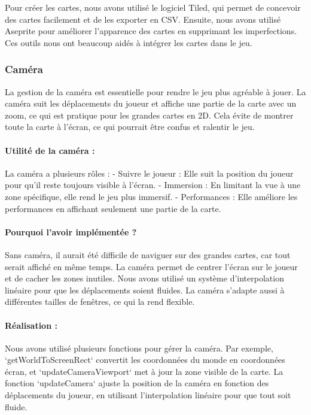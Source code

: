 \documentclass[12pt,a4paper, twoside]{article}
\begin{document}
    Pour créer les cartes, nous avons utilisé le logiciel Tiled, qui permet de concevoir des cartes facilement et de les exporter en CSV. Ensuite, nous avons utilisé Aseprite pour améliorer l'apparence des cartes en supprimant les imperfections. Ces outils nous ont beaucoup aidés à intégrer les cartes dans le jeu.
    \subsubsection{Caméra}
    La gestion de la caméra est essentielle pour rendre le jeu plus agréable à jouer. La caméra suit les déplacements du joueur et affiche une partie de la carte avec un zoom, ce qui est pratique pour les grandes cartes en 2D. Cela évite de montrer toute la carte à l'écran, ce qui pourrait être confus et ralentir le jeu.

    \paragraph{Utilité de la caméra :} La caméra a plusieurs rôles :
    - Suivre le joueur : Elle suit la position du joueur pour qu'il reste toujours visible à l'écran.
    - Immersion : En limitant la vue à une zone spécifique, elle rend le jeu plus immersif.
    - Performances : Elle améliore les performances en affichant seulement une partie de la carte.

    \paragraph{Pourquoi l'avoir implémentée ?}

    Sans caméra, il aurait été difficile de naviguer sur des grandes cartes, car tout serait affiché en même temps. La caméra permet de centrer l'écran sur le joueur et de cacher les zones inutiles. Nous avons utilisé un système d'interpolation linéaire pour que les déplacements soient fluides. La caméra s'adapte aussi à différentes tailles de fenêtres, ce qui la rend flexible.

    \paragraph{Réalisation : }
    Nous avons utilisé plusieurs fonctions pour gérer la caméra. Par exemple, `getWorldToScreenRect` convertit les coordonnées du monde en coordonnées écran, et `updateCameraViewport` met à jour la zone visible de la carte. La fonction `updateCamera` ajuste la position de la caméra en fonction des déplacements du joueur, en utilisant l'interpolation linéaire pour que tout soit fluide.
\end{document}
